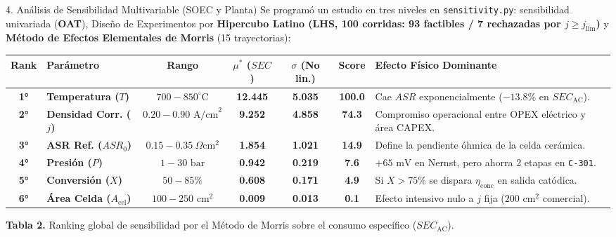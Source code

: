 \documentclass[12pt]{article}
\begin{document}
\begin{minipage}[t]{0.49\linewidth}
    \vspace{0pt}

    \begin{posterbox}[primaryblue]{4. Análisis de Sensibilidad Multivariable (SOEC y Planta)}
        \fontsize{14.8}{18.8}\selectfont
        Se programó un estudio en tres niveles en \texttt{sensitivity.py}: sensibilidad univariada (\textbf{OAT}), Diseño de Experimentos por \textbf{Hipercubo Latino (LHS, 100 corridas: 93 factibles / 7 rechazadas por $j \ge j_{\text{lim}}$)} y \textbf{Método de Efectos Elementales de Morris} (15 trayectorias):

        \vspace{8pt}
        \renewcommand{\arraystretch}{1.36}
        \setlength{\tabcolsep}{6pt}
        \begin{tabularx}{\linewidth}{c l c c c c X}
            \toprule
            \rowcolor{primaryblue}
            \textbf{\color{white}Rank} & \textbf{\color{white}Parámetro} & \textbf{\color{white}Rango} & \textbf{\color{white}$\mu^*$ ($SEC$)} & \textbf{\color{white}$\sigma$ (No lin.)} & \textbf{\color{white}Score} & \textbf{\color{white}Efecto Físico Dominante} \\
            \midrule
            \textbf{1°} & \textbf{Temperatura ($T$)} & $700-850^\circ\text{C}$ & \textbf{12.445} & \textbf{5.035} & \textbf{100.0} & Cae $ASR$ exponencialmente ($-13.8\%$ en $SEC_{\text{AC}}$). \\
            \rowcolor{tablerowgray}
            \textbf{2°} & \textbf{Densidad Corr. ($j$)} & $0.20-0.90\text{ A/cm}^2$ & \textbf{9.252} & \textbf{4.858} & \textbf{74.3} & Compromiso operacional entre OPEX eléctrico y área CAPEX. \\
            \textbf{3°} & \textbf{ASR Ref. ($ASR_0$)} & $0.15-0.35\ \Omega\text{cm}^2$ & \textbf{1.854} & \textbf{1.021} & \textbf{14.9} & Define la pendiente óhmica de la celda cerámica. \\
            \rowcolor{tablerowgray}
            \textbf{4°} & \textbf{Presión ($P$)} & $1-30\text{ bar}$ & \textbf{0.942} & \textbf{0.219} & \textbf{7.6} & $+65\text{ mV}$ en Nernst, pero ahorra 2 etapas en \texttt{C-301}. \\
            \textbf{5°} & \textbf{Conversión ($X$)} & $50-85\%$ & \textbf{0.608} & \textbf{0.171} & \textbf{4.9} & Si $X > 75\%$ se dispara $\eta_{\text{conc}}$ en salida catódica. \\
            \rowcolor{tablerowgray}
            \textbf{6°} & \textbf{Área Celda ($A_{\text{cel}}$)} & $100-250\text{ cm}^2$ & \textbf{0.009} & \textbf{0.013} & \textbf{0.1} & Efecto intensivo nulo a $j$ fija ($200\text{ cm}^2$ comercial). \\
            \bottomrule
        \end{tabularx}
        \vspace{4pt}
        {\large\textbf{Tabla 2.} Ranking global de sensibilidad por el Método de Morris sobre el consumo específico ($SEC_{\text{AC}}$).}


\end{posterbox}
\end{minipage}
\end{document}
